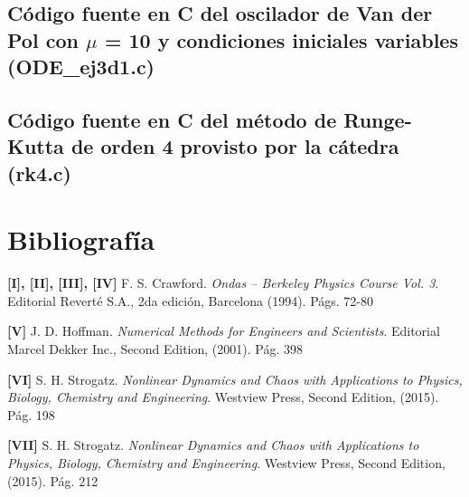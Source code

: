 \documentclass[a4paper,12pt]{article}
\begin{document}



\subsection{C\'odigo fuente en C del oscilador de Van der Pol con $\mu$ = 10 y condiciones iniciales variables (ODE\_ej3d1.c)}



\newpage
\subsection{C\'odigo fuente en C del m\'etodo de Runge-Kutta de orden 4 provisto por la c\'atedra (rk4.c)}


\newpage
\section{Bibliograf\'ia}
\textbf{[I], [II], [III], [IV]} F. S. Crawford. \textit{Ondas – Berkeley Physics Course Vol. 3}. Editorial Revert\'e S.A., 2da edici\'on, Barcelona (1994). P\'ags. 72-80

\textbf{[V]} J. D. Hoffman. \textit{Numerical Methods for Engineers and Scientists}. Editorial Marcel Dekker Inc., Second Edition, (2001). P\'ag. 398

\textbf{[VI]} S. H. Strogatz. \textit{Nonlinear Dynamics and Chaos with Applications to Physics, Biology, Chemistry and Engineering}. Westview Press, Second Edition, (2015). P\'ag. 198

\textbf{[VII]} S. H. Strogatz. \textit{Nonlinear Dynamics and Chaos with Applications to Physics, Biology, Chemistry and Engineering}. Westview Press, Second Edition, (2015). P\'ag. 212
\end{document}

